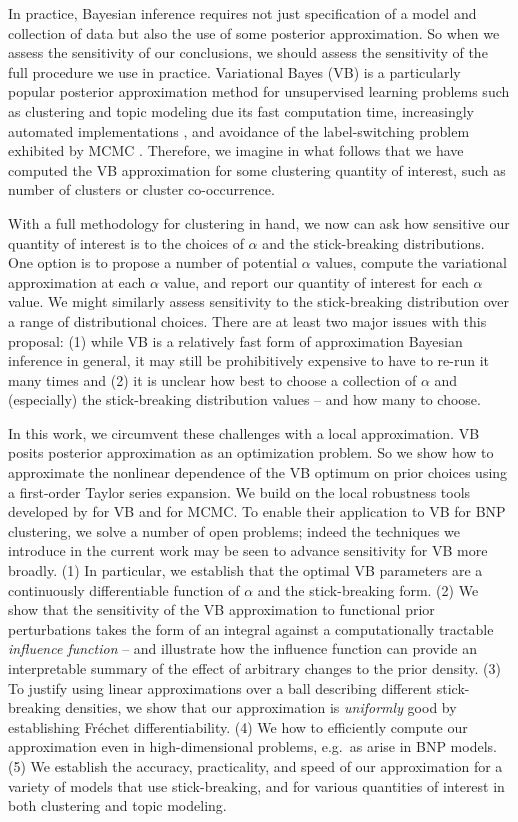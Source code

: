 In practice, Bayesian inference requires not just specification of a model and collection of data but also the use of some posterior approximation. So when we assess the sensitivity of our conclusions, we should assess the sensitivity of the full procedure we use in practice. Variational Bayes (VB) is a particularly popular posterior approximation method for unsupervised learning problems such as clustering and topic modeling due its fast computation time, increasingly automated implementations
\citep{ranganath:2013:black, kucukelbir:2016:advi}, and avoidance of the label-switching problem exhibited by MCMC \citep{jasra:2005:mcmclabelswitch}. Therefore, we imagine in what follows that we have computed the VB approximation for some clustering quantity of interest, such as number of clusters or cluster co-occurrence.

With a full methodology for clustering in hand, we now can ask how sensitive our quantity of interest is to the choices of $\alpha$ and the stick-breaking distributions. One option is to propose a number of potential $\alpha$ values, compute the variational approximation at each $\alpha$ value, and report our quantity of interest for each $\alpha$ value. We might similarly assess sensitivity to the stick-breaking distribution over a range of distributional choices. There are at least two major issues with this proposal: (1) while VB is a relatively fast form of approximation Bayesian inference in general, it may still be prohibitively expensive to have to re-run it many times and (2) it is unclear how best to choose a collection of $\alpha$ and (especially) the stick-breaking distribution values -- and how many to choose.

In this work, we circumvent these challenges with a local approximation. VB posits posterior approximation as an optimization problem. So we show how to approximate the nonlinear dependence of the VB optimum on prior choices using a
first-order Taylor series expansion. We build on the local robustness tools developed by \cite{giordano:2018:covariances} for VB and \cite{gustafson:1996:local} for MCMC. To enable their application to VB for BNP clustering, we solve a number of open problems; indeed the techniques we introduce in the current work may be seen to advance sensitivity for VB more broadly. (1) In particular, we establish that the optimal VB parameters are a continuously differentiable function of $\alpha$ and the stick-breaking form. (2) We show that the sensitivity
of the VB approximation to functional prior perturbations takes the form of
an integral against a computationally tractable \textit{influence function} -- and illustrate how the influence function can provide an interpretable summary of the effect of arbitrary changes to
the prior density. (3) To justify using linear approximations over a ball describing different stick-breaking densities, we show that our approximation is \textit{uniformly} good by establishing Fr\'echet differentiability. (4) We how to efficiently
compute our approximation even in high-dimensional problems, e.g.\ as arise in BNP models. (5) We establish the accuracy, practicality, and speed of our approximation for a variety of models that use stick-breaking, and for various quantities of interest in both clustering and topic modeling.
